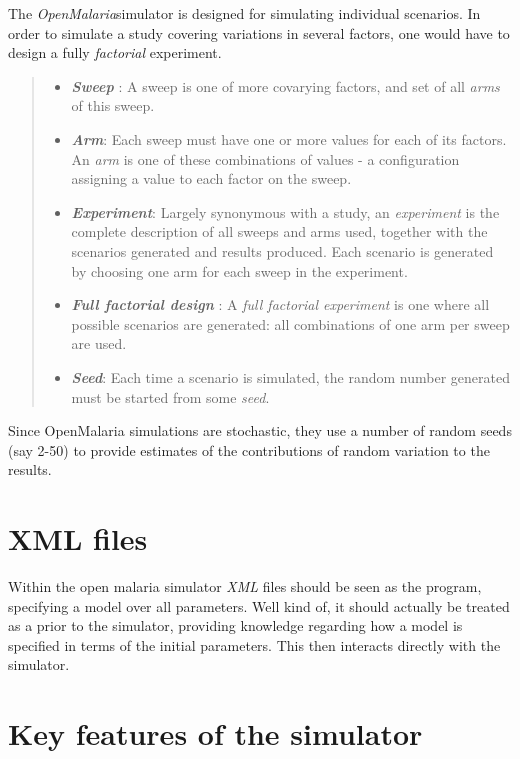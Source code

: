\documentclass[]{scrartcl}
\newcommand{\om}{\textit{OpenMalaria}}
\begin{document}
The \om simulator is designed for simulating individual scenarios. 
In order to simulate a study covering variations in several factors, one 
would have to  design a fully \textit{factorial} experiment.

\begin{quote}
	\begin{itemize}
		\item \textbf{\textit{Sweep}} : A sweep is one of more covarying factors, and set of all \textit{arms} of this sweep.
		\item \textbf{\textit{Arm}}: Each sweep must have one or more values for each of its factors. An \textit{arm} 
		is one of these combinations of values - a configuration assigning a value to each factor on the sweep. 
		\item \textbf{\textit{Experiment}}: Largely synonymous with a study, an \textit{experiment} is the complete
		description of all sweeps and arms used, together with the scenarios generated and results produced. Each scenario is generated by choosing
		one arm for each sweep in the experiment. 
		\item \textbf{\textit{Full factorial design}} : A \textit{full factorial experiment} is one where all possible scenarios are generated: all
		combinations of one arm per sweep are used.
		\item \textbf{\textit{Seed}}: Each time a scenario is simulated, the random number generated must be started from some \textit{seed}.
	\end{itemize}
\end{quote}


Since OpenMalaria simulations are stochastic, they use a number of random seeds (say 2-50) 
to provide estimates of the contributions of random variation to the results.

\section{XML files}

Within the open malaria simulator \textit{XML} files should be seen as the program, specifying a model over all parameters. Well kind of, it should actually be treated as a prior to the simulator, providing knowledge regarding how a model is specified in terms of the initial parameters. This then interacts directly with the simulator. 


\section{Key features of the simulator}
\end{document}
